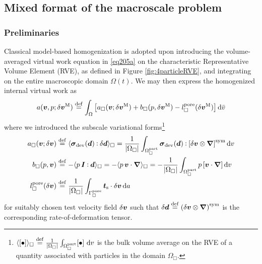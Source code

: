 \documentclass[10pt,a4paper]{article}
\newcommand{\fluid}{\mathrm{part}}
\newcommand{\pore}{\mathrm{pore}}
\newcommand{\surf}{\mathrm{s}}
\begin{document}
\subsection{Mixed format of the macroscale problem}

\subsubsection{Preliminaries}

Classical model-based homogenization is adopted upon introducing the volume-averaged virtual work equation in \eqref{eq205a} on the characteristic Representative Volume Element (RVE), as defined in Figure \ref{fig:4particleRVE}, and integrating on the entire macroscopic domain $\Omega(t)$. We may then express the homogenized internal virtual work as
\begin{equation}
    a(\ta{v},p; \delta \ta{v}^\macro) \defeq
    \int_{\Omega} \left[
    a_\Box(\ta{v};\delta \ta{v}^\macro) + b_\Box(p, \delta \ta{v}^\macro) - l_\Box^\pore(\delta \ta{v}^\macro)
    \right] \dif \bar{v}
\label{eq402a}
\end{equation}
where we introduced the subscale variational forms\footnote{$\langle[\bullet]\rangle_\Box\defeq\frac{1}{|\Omega_\Box|}\int_{\Omega^\fluid_\Box}[\bullet] \, \dif v$ is the bulk volume average on the RVE of a quantity associated with particles in the domain $\Omega_\Box$.}
\begin{align}
    a_\Box(\ta{v};\delta \ta{v})
    & \defeq
    \langle \ts{\sigma}_\dev(\ts{d}) \dprod \delta \ts{d} \rangle_\Box =
    \frac{1}{|\Omega_\Box|}\int_{\Omega^\fluid_\Box} \ts{\sigma}_\dev(\ts{d}) \dprod \left[\delta \ta{v}\outerp\diff\right]^\sym \dif v
\label{eq403a}
\\
    b_\Box(p, \ta{v})
    & \defeq
    - \langle p\,\ts{I}\dprod\ts{d} \rangle_\Box =
    - \langle p\,\ta{v}\cdot\diff \rangle_\Box =
    - \frac{1}{|\Omega_\Box|}\int_{\Omega^\fluid_\Box} p \left[\ta{v}\cdot\diff\right] \dif v
\label{eq403b}
\\
    l_\Box^\pore(\delta \ta{v})
    & \defeq
    \frac{1}{|\Omega_\Box|} \int_{\Gamma_\Box^\pore} \ta{t}_\surf \cdot \delta\ta{v} \dif a
\label{eq403c}
\end{align}
for suitably chosen test velocity field $\delta\boldsymbol{v}$ such that $\delta\boldsymbol{d}\overset{\mathrm{def}}{=}\left(\delta\boldsymbol{v}\mathbin{\otimes}\boldsymbol{\nabla}\right)^{\mathrm{sym}}$ is the corresponding rate-of-deformation tensor.
\end{document}
